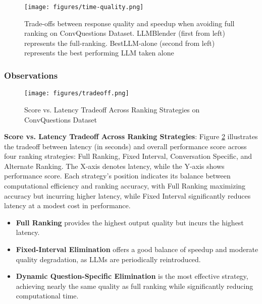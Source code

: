 \documentclass[sigconf,authordraft]{acmart}
\begin{document}
\begin{figure}
    \centering
    \texttt{[image: figures/time-quality.png]}
    \caption{Trade-offs between response quality and speedup when avoiding full ranking on ConvQuestions Dataset. LLMBlender (first from left) represents the full-ranking. BestLLM-alone (second from left) represents the best performing LLM taken alone}
    \label{fig:enter-label}
\end{figure}


\subsubsection{Observations}
\begin{figure}
    \centering
    \texttt{[image: figures/tradeoff.png]}
    \caption{Score vs. Latency Tradeoff Across Ranking Strategies on ConvQuestions Dataset}
    \label{fig:tradeff}
\end{figure}

\textbf{Score vs. Latency Tradeoff Across Ranking Strategies}: Figure \ref{fig:tradeff} illustrates the tradeoff between latency (in seconds) and overall performance score across four ranking strategies: Full Ranking, Fixed Interval, Conversation Specific, and Alternate Ranking. The X-axis denotes latency, while the Y-axis shows performance score. Each strategy’s position indicates its balance between computational efficiency and ranking accuracy, with Full Ranking maximizing accuracy but incurring higher latency, while Fixed Interval significantly reduces latency at a modest cost in performance. 

\begin{itemize}
    \item \textbf{Full Ranking} provides the highest output quality but incurs the highest latency.
    \item \textbf{Fixed-Interval Elimination} offers a good balance of speedup and moderate quality degradation, as LLMs are periodically reintroduced.
    \item \textbf{Dynamic Question-Specific Elimination} is the most effective strategy, achieving nearly the same quality as full ranking while significantly reducing computational time.
\end{itemize}
\end{document}
